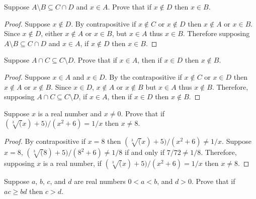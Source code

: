 \begin{tcolorbox}[title=Problem 8, breakable]
    Suppose $A \setminus B \subseteq C \cap D$ and $x \in A$. Prove that if 
    $x \not \in D$ then $x \in B$.
\end{tcolorbox}

\begin{proof}
    Suppose $x \not \in D$. By contrapositive if $x \not \in C$ or $ x \not \in D$
    then $x \not \in A$ or  $x \in B$. Since $x \not \in D$, either $x \not \in A$ or $x \in B$, 
    but $x \in A$ thus $x \in B$. Therefore supposing $A \setminus B \subseteq C \cap D$ and $x \in A$,
    if $x \not \in D$ then $x \in B$.
\end{proof}

\begin{tcolorbox}[title=Problem 9, breakable]
    Suppose $A \cap C \subseteq C \setminus D$. Prove that if $x \in A$, then if $x \in D$
    then $x \not \in B$.
\end{tcolorbox}

\begin{proof}
    Suppose $x \in A$ and $x \in D$. By the contrapositive 
    if $x \not \in C$ or $x \in D$ then $x \not \in A$ or $x \not \in B$.
    Since $x \in D$, $x \not \in A$ or $x \not \in B$ but $x \in A$ thus $x \not \in B$.
    Therefore, supposing $A \cap C \subseteq C \setminus D$, if $x \in A$, then if $x \in D$
    then $x \not \in B$.
\end{proof}

\begin{tcolorbox}[title=Problem 11, breakable]
    Suppose $x$ is a real number and $x \not = 0$. Prove that if 
    $(\sqrt[3](x) + 5) / (x^2 + 6) = 1 / x$ then $x \not = 8$.
\end{tcolorbox}

\begin{proof}
    By contrapositive if $x = 8$ then  $(\sqrt[3](x) + 5) / (x^2 + 6) \not = 1 / x$. Suppose $x = 8$,
    $(\sqrt[3](8) + 5) / (8^2 + 6) \not = 1 / 8$ if and only if $7 / 72 \not = 1 / 8$. Therefore,
    supposing $x$ is a real number,
    if $(\sqrt[3](x) + 5) / (x^2 + 6) = 1 / x$ then $x \not = 8$. 
\end{proof}

\begin{tcolorbox}[title=Problem 12, breakable]
    Suppose $a$, $b$, $c$, and $d$ are real numbers $0 < a < b$, and $d > 0$. Prove that 
    if $ac \ge bd$ then $c > d$.
\end{tcolorbox}

